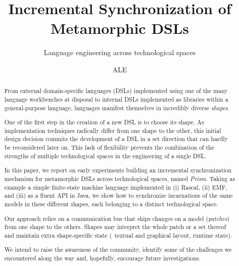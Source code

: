 \documentclass[sigplan]{acmart}
\begin{document}
\title{Incremental Synchronization of Metamorphic DSLs}
\subtitle{Language engineering across technological spaces}

\author{ALE}


\begin{abstract}
%
From external domain-specific languages (DSLs) implemented using one of the many language workbenches at disposal to internal DSLs implemented as libraries within a general-purpose language, languages manifest themselves in incredibly diverse \emph{shapes}.

%
One of the first step in the creation of a new DSL is to choose its shape.
As implementation techniques radically differ from one shape to the other, this initial design decision commits the development of a DSL in a set direction that can hardly be reconsidered later on.
This lack of flexibility prevents the combination of the strengths of multiple technological spaces in the engineering of a single DSL.

%
In this paper, we report on early experiments building an incremental synchronization mechanism for metamorphic DSLs across technological spaces, named \emph{Prism}.
Taking as example a simple finite-state machine language implemented in (i) Rascal, (ii) EMF, and (iii) as a fluent API in Java, we show how to synchronize incarnations of the same models in these different shapes, each belonging to a distinct technological space.

%
Our approach relies on a communication bus that ships changes on a model (\emph{patches}) from one shape to the others.
Shapes may interpret the whole patch or a set thereof and maintain extra shape-specific state (\eg~textual and graphical layout, runtime state).

%
We intend to raise the awareness of the community, identify some of the challenges we encountered along the way and, hopefully, encourage future investigations.
\end{abstract}
\end{document}
